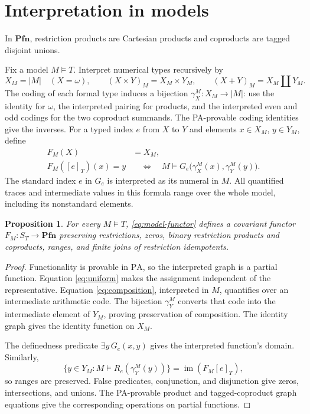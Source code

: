 \documentclass[11pt]{article}
\newtheorem{proposition}[theorem]{Proposition}
\newcommand{\PA}{\mathrm{PA}}
\newcommand{\Pfn}{\mathbf{Pfn}}
\begin{document}
\section{Interpretation in models}\label{sec:models}

In $\Pfn$, restriction products are Cartesian products and coproducts
are tagged disjoint unions.

Fix a model $M\models T$. Interpret numerical types recursively by
\[
 X_M=|M|\quad(X=\omega),\qquad
 (X\times Y)_M=X_M\times Y_M,\qquad
 (X+Y)_M=X_M\amalg Y_M.
\]
The coding of each formal type induces a bijection
$\gamma_X^M:X_M\to|M|$: use the identity for $\omega$, the
interpreted pairing for products, and the interpreted even and odd
codings for the two coproduct summands. The PA-provable coding
identities give the inverses. For a typed index $e$ from $X$ to $Y$
and elements $x\in X_M$, $y\in Y_M$, define
\begin{equation}\label{eq:model-functor}
 \begin{aligned}
 F_M(X)&=X_M,\\
 F_M([e]_T)(x)=y
 &\quad\Longleftrightarrow\quad
 M\models G_e\bigl(\gamma_X^M(x),\gamma_Y^M(y)\bigr).
 \end{aligned}
\end{equation}
The standard index $e$ in $G_e$ is interpreted as its numeral in $M$.
All quantified traces and intermediate values in this formula range over
the whole model, including its nonstandard elements.

\begin{proposition}\label{prop:model}
For every $M\models T$, \eqref{eq:model-functor} defines a covariant
functor $F_M:S_T\to\Pfn$ preserving restrictions, zeros, binary
restriction products and coproducts, ranges, and finite joins of
restriction idempotents.
\end{proposition}
\begin{proof}
Functionality is provable in $\PA$, so the interpreted graph is a
partial function. Equation \eqref{eq:uniform} makes the assignment
independent of the representative. Equation \eqref{eq:composition},
interpreted in $M$, quantifies over an intermediate arithmetic code.
The bijection $\gamma_Y^M$ converts that code into the intermediate
element of $Y_M$, proving preservation of composition. The identity
graph gives the identity function on $X_M$.

The definedness predicate $\exists y\,G_e(x,y)$ gives the interpreted
function's domain. Similarly,
\[
 \{y\in Y_M:M\models R_e(\gamma_Y^M(y))\}
 =\operatorname{im}(F_M[e]_T),
\]
so ranges are preserved. False predicates, conjunction, and disjunction
give zeros, intersections, and unions. The PA-provable product and
tagged-coproduct graph equations give the corresponding operations on
partial functions.
\end{proof}
\end{document}
